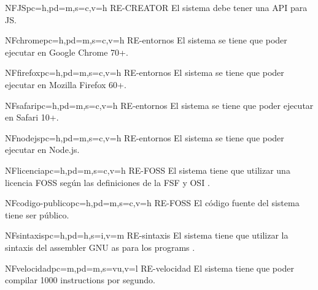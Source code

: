 \begin{softwareReq}{NF}{JS}{pc=h,pd=m,s=c,v=h}
    {RE-CREATOR}
    El sistema debe tener una \gls{API} para \gls{JS}.
\end{softwareReq}

\begin{softwareReq}{NF}{chrome}{pc=h,pd=m,s=c,v=h}
    {RE-entornos}
    El sistema se tiene que poder ejecutar en Google Chrome 70+.
\end{softwareReq}

\begin{softwareReq}{NF}{firefox}{pc=h,pd=m,s=c,v=h}
    {RE-entornos}
    El sistema se tiene que poder ejecutar en Mozilla Firefox 60+.
\end{softwareReq}

\begin{softwareReq}{NF}{safari}{pc=h,pd=m,s=c,v=h}
    {RE-entornos}
    El sistema se tiene que poder ejecutar en Safari 10+.
\end{softwareReq}

\begin{softwareReq}{NF}{nodejs}{pc=h,pd=m,s=c,v=h}
    {RE-entornos}
    El sistema se tiene que poder ejecutar en Node.js.
\end{softwareReq}

\begin{softwareReq}{NF}{licencia}{pc=h,pd=m,s=c,v=h}
    {RE-FOSS}
    El sistema tiene que utilizar una licencia \gls{FOSS} según las definiciones
    de la \gls{FSF} \parencite{FreeSoftware} y \gls{OSI} \parencite{OpenSource}.
\end{softwareReq}

\begin{softwareReq}{NF}{codigo-publico}{pc=h,pd=m,s=c,v=h}
    {RE-FOSS}
    El código fuente del sistema tiene ser público.
\end{softwareReq}

\begin{softwareReq}{NF}{sintaxis}{pc=h,pd=h,s=i,v=m}
    {RE-sintaxis}
    El sistema tiene que utilizar la sintaxis del \gls{assembler} GNU as
    \parencite{as-manual} para los \glspl{program} .
\end{softwareReq}

\begin{softwareReq}{NF}{velocidad}{pc=m,pd=m,s=vu,v=l}
    {RE-velocidad}
    El sistema tiene que poder compilar 1000 \glspl{instruction} por segundo.
\end{softwareReq}

